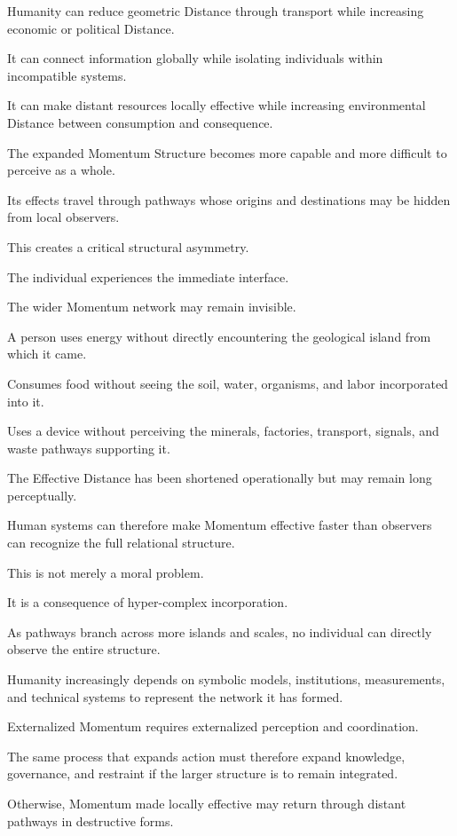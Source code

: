 Humanity can reduce geometric Distance through transport while increasing economic or political Distance.

It can connect information globally while isolating individuals within incompatible systems.

It can make distant resources locally effective while increasing environmental Distance between consumption and consequence.

The expanded Momentum Structure becomes more capable and more difficult to perceive as a whole.

Its effects travel through pathways whose origins and destinations may be hidden from local observers.

This creates a critical structural asymmetry.

The individual experiences the immediate interface.

The wider Momentum network may remain invisible.

A person uses energy without directly encountering the geological island from which it came.

Consumes food without seeing the soil, water, organisms, and labor incorporated into it.

Uses a device without perceiving the minerals, factories, transport, signals, and waste pathways supporting it.

The Effective Distance has been shortened operationally but may remain long perceptually.

Human systems can therefore make Momentum effective faster than observers can recognize the full relational structure.

This is not merely a moral problem.

It is a consequence of hyper-complex incorporation.

As pathways branch across more islands and scales, no individual can directly observe the entire structure.

Humanity increasingly depends on symbolic models, institutions, measurements, and technical systems to represent the network it has formed.

Externalized Momentum requires externalized perception and coordination.

The same process that expands action must therefore expand knowledge, governance, and restraint if the larger structure is to remain integrated.

Otherwise, Momentum made locally effective may return through distant pathways in destructive forms.


